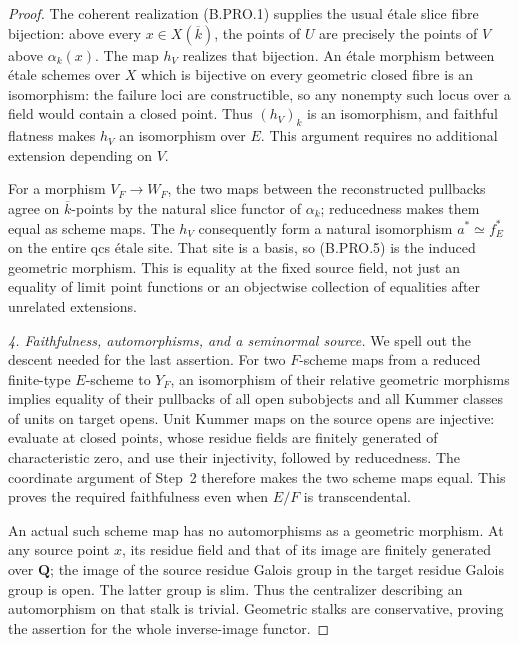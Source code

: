 \documentclass[11pt,a4paper]{article}
\newcommand{\Q}{\mathbf Q}
\begin{document}
\begin{proof}
The coherent realization (B.PRO.1) supplies the usual étale
slice fibre bijection: above every \(x\in X(\overline k)\),
the points of \(U\) are precisely the points of \(V\) above
\(\alpha_k(x)\). The map \(h_V\) realizes that bijection.
An étale morphism between étale schemes over \(X\) which is
bijective on every geometric closed fibre is an isomorphism:
the failure loci are constructible, so any nonempty such locus
over a field would contain a closed point. Thus \((h_V)_k\)
is an isomorphism, and faithful flatness makes \(h_V\) an
isomorphism over \(E\). This argument requires no additional
extension depending on \(V\).

For a morphism \(V_F\to W_F\), the two maps between the
reconstructed pullbacks agree on \(\overline k\)-points by
the natural slice functor of \(\alpha_k\); reducedness makes
them equal as scheme maps. The \(h_V\) consequently form a
natural isomorphism \(a^*\simeq f_E^*\) on the entire qcs
étale site. That site is a basis, so (B.PRO.5) is the induced
geometric morphism. This is equality at the fixed source field,
not just an equality of limit point functions or an objectwise
collection of equalities after unrelated extensions.

\emph{4. Faithfulness, automorphisms, and a seminormal source.}
We spell out the descent needed for the last assertion. For two
\(F\)-scheme maps from a reduced finite-type \(E\)-scheme to
\(Y_F\), an isomorphism of their relative geometric morphisms
implies equality of their pullbacks of all open subobjects and
all Kummer classes of units on target opens. Unit Kummer maps
on the source opens are injective: evaluate at closed points,
whose residue fields are finitely generated of characteristic
zero, and use their injectivity, followed by reducedness.
The coordinate argument of Step~2 therefore makes the two
scheme maps equal. This proves the required faithfulness even
when \(E/F\) is transcendental.

An actual such scheme map has no automorphisms as a geometric
morphism. At any source point \(x\), its residue field and
that of its image are finitely generated over \(\Q\); the
image of the source residue Galois group in the target residue
Galois group is open. The latter group is slim. Thus the
centralizer describing an automorphism on that stalk is trivial.
Geometric stalks are conservative, proving the assertion for
the whole inverse-image functor.


\end{proof}
\end{document}
